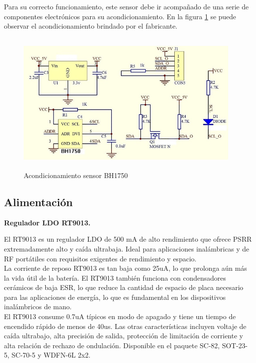 Para su correcto funcionamiento, este sensor debe ir acompañado de una serie de componentes electrónicos para su acondicionamiento.
En la figura \ref{imag:acondicionamiento_BH1750} se puede observar el acondicionamiento brindado por el fabricante.

\begin{figure}[H]
    \centering
    \includegraphics[width=11cm, height=7cm]{imagenes/acondicionamientos sensor BH1750.jpg}
    \caption{Acondicionamiento sensor BH1750}
    \label{imag:acondicionamiento_BH1750}
\end{figure}

\vspace{1cm}

\subsection{Alimentación}

\textbf{Regulador LDO RT9013.}\newline

El RT9013 es un regulador LDO de 500 mA de alto rendimiento que ofrece PSRR extremadamente alto y caída ultrabaja. Ideal para aplicaciones inalámbricas y de RF portátiles con requisitos exigentes de rendimiento y espacio.\\

La corriente de reposo RT9013 es tan baja como 25uA, lo que prolonga aún más la vida útil de la batería. El RT9013 también funciona con condensadores cerámicos de baja ESR, lo que reduce la cantidad de espacio de placa necesario para las aplicaciones de energía, lo que es fundamental en los dispositivos inalámbricos de mano.\\

El RT9013 consume 0.7uA típicos en modo de apagado y tiene un tiempo de encendido rápido de menos de 40us. Las otras características incluyen voltaje de caída ultrabajo, alta precisión de salida, protección de limitación de corriente y alta relación de rechazo de ondulación. Disponible en el paquete SC-82, SOT-23-5, SC-70-5 y WDFN-6L 2x2.\\

